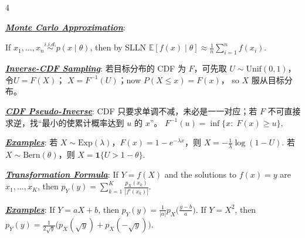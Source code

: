 \documentclass[12pt]{article}
\newcommand{\bulletPoint}[1]{\underline{\textit{\textbf{#1}}}}
\begin{document}
\begin{multicols*}{4}




\bulletPoint{Monte Carlo Approximation}:

If $x_1,\dots,x_n \overset{i.i.d.}{\sim} p(x\mid \theta)$, then by SLLN
$\mathbb E[f(x)\mid \theta]\approx \frac{1}{n}\sum_{i=1}^n f(x_i).$

\bulletPoint{Inverse-CDF Sampling}:
若目标分布的 CDF 为 $F$，可先取 $U\sim \mathrm{Unif}(0,1)$，
令$U=F(X)$； $X=F^{-1}(U)$；now $P(X\le x)=F(x)$，
so $X$ 服从目标分布。

\bulletPoint{CDF Pseudo-Inverse}:
CDF 只要求单调不减，未必是一一对应；若 $F$ 不可直接求逆，找“最小的使累计概率达到 $u$ 的 $x$”。
$F^{-1}(u)=\inf\{x:\; F(x)\ge u\},$

\bulletPoint{Examples}:
若 $X\sim \mathrm{Exp}(\lambda)$，$F(x)=1-e^{-\lambda x}$，则
$X=-\frac{1}{\lambda}\log(1-U).$
若 $X\sim \mathrm{Bern}(\theta)$，则
$X=\mathbf 1\{U>1-\theta\}.$

\bulletPoint{Transformation Formula}:
If $Y=f(X)$ and the solutions to $f(x)=y$ are $x_1,\dots,x_K$, then
\textcolor{blue!50!black}{$\textstyle
p_Y(y)=\sum_{k=1}^K \frac{p_X(x_k)}{|f'(x_k)|}.
$}

\bulletPoint{Examples}:
If $Y=aX+b$, then
$p_Y(y)=\frac{1}{|a|}p_X\!\bigl(\frac{y-b}{a}\bigr).$
If $Y=X^2$, then
$p_Y(y)=\frac{1}{2\sqrt y}\bigl(p_X(\sqrt y)+p_X(-\sqrt y)\bigr).$


\end{multicols*}
\end{document}

